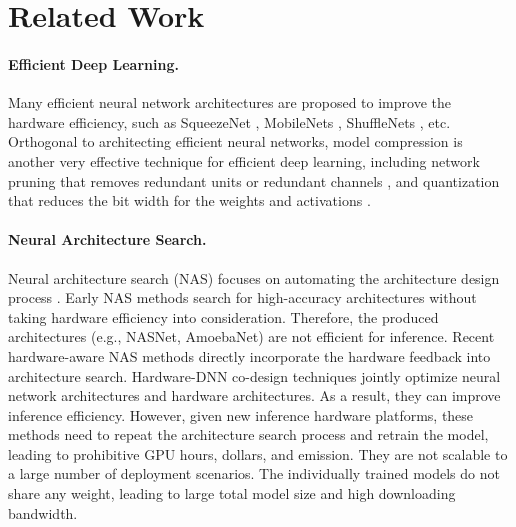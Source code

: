 \documentclass{article} \usepackage{iclr2020_conference,times}
\newcommand{\myparagraph}[1]{\vspace{-3pt}\paragraph{#1}}
\begin{document}
\section{Related Work}
\myparagraph{Efficient Deep Learning.} 
Many efficient neural network architectures are proposed to improve the hardware efficiency, such as SqueezeNet \citep{iandola2016squeezenet}, MobileNets \citep{howard2017mobilenets,sandler2018mobilenetv2}, ShuffleNets \citep{ma2018shufflenet,zhang2018shufflenet}, etc. 
Orthogonal to architecting efficient neural networks, model compression \citep{han2016deep} is another very effective technique for efficient deep learning,
including network pruning that removes redundant units \citep{han2015learning} or redundant channels \citep{he2018amc,liu2017learning}, and quantization that reduces the bit width for the weights and activations \citep{han2016deep,courbariaux2015binaryconnect,zhu2016trained}. 

\myparagraph{Neural Architecture Search.} 
Neural architecture search (NAS) focuses on automating the architecture design process \citep{zoph2017neural,zoph2018learning,real2018regularized,cai2018efficient,liu2019darts}.
Early NAS methods \citep{zoph2018learning,real2018regularized,cai2018path} search for high-accuracy architectures without taking hardware efficiency into consideration. Therefore, the produced architectures (e.g., NASNet, AmoebaNet) are not efficient for inference. Recent hardware-aware NAS methods \citep{cai2019proxylessnas, tan2018mnasnet, wu2018fbnet} directly incorporate the hardware feedback into architecture search. Hardware-DNN co-design techniques \citep{jiang2019accuracy,jiang2019hardware,hao2019fpga} jointly optimize neural network architectures and hardware architectures. 
As a result, they can improve inference efficiency. 
However, given new inference hardware platforms, these methods need to repeat the architecture search process and retrain the model, leading to prohibitive GPU hours, dollars, and  emission. They are not scalable to a large number of deployment scenarios. The individually trained models do not share any weight, leading to large total model size and high downloading bandwidth.
\end{document}
